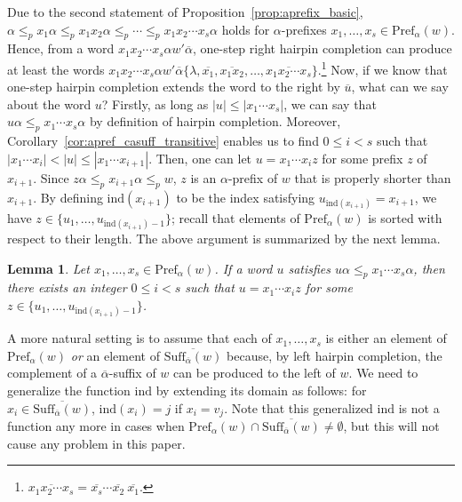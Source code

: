 \documentclass{article}
\theoremstyle{plain}
\newtheorem{lemma}{Lemma}
\theoremstyle{remark}
\newcommand{\Pref}{\ensuremath{\mathrm{Pref}}}
\newcommand{\Suff}{\ensuremath{\mathrm{Suff}}}
\newcommand{\ind}{\ensuremath{\mathrm{ind}}}
\newcommand{\calpha}{\ensuremath{\overline{\alpha}}}
\begin{document}
Due to the second statement of Proposition~\ref{prop:aprefix_basic}, $\alpha \le_p x_1 \alpha \le_p x_1 x_2 \alpha \le_p \cdots \le_p x_1 x_2 \cdots x_s \alpha$ holds for $\alpha$-prefixes $x_1, \ldots, x_s \in \Pref_\alpha(w)$. 
Hence, from a word $x_1 x_2 \cdots x_s \alpha w' \calpha$, one-step right hairpin completion can produce at least the words $x_1 x_2 \cdots x_s \alpha w' \calpha \{\lambda, \overline{x_1}, \overline{x_1x_2}, \ldots, \overline{x_1 x_2 \cdots x_s}\}$.\footnote{$\overline{x_1x_2 \cdots x_s} = \overline{x_s} \cdots \overline{x_2} \ \overline{x_1}$.} 
Now, if we know that one-step hairpin completion extends the word to the right by $\overline{u}$, what can we say about the word $u$? 
Firstly, as long as $|u| \le |x_1 \cdots x_s|$, we can say that $u\alpha \le_p x_1 \cdots x_s \alpha$ by definition of hairpin completion. 
Moreover, Corollary~\ref{cor:apref_casuff_transitive} enables us to find $0 \le i < s$ such that $|x_1 \cdots x_i| < |u| \le |x_1 \cdots x_{i+1}|$. 
Then, one can let $u = x_1 \cdots x_i z$ for some prefix $z$ of $x_{i+1}$. 
Since $z \alpha \le_p x_{i+1} \alpha \le_p w$, $z$ is an $\alpha$-prefix of $w$ that is properly shorter than $x_{i+1}$. 
By defining $\ind(x_{i+1})$ to be the index satisfying $u_{\ind(x_{i+1})} = x_{i+1}$, we have $z \in \{u_1, \ldots, u_{\ind(x_{i+1})-1}\}$; recall that elements of $\Pref_\alpha(w)$ is sorted with respect to their length. 
The above argument is summarized by the next lemma. 

\begin{lemma}\label{lem:aprefix_prefix}
	Let $x_1, \ldots, x_s \in \Pref_\alpha(w)$. 
	If a word $u$ satisfies $u\alpha \le_p x_1 \cdots x_s \alpha$, then there exists an integer $0 \le i < s$ such that $u = x_1 \cdots x_i z$ for some $z \in \{u_1, \ldots, u_{\ind(x_{i+1})-1}\}$. 
\end{lemma}

A more natural setting is to assume that each of $x_1, \ldots, x_s$ is either an element of $\Pref_\alpha(w)$ {\it or} an element of $\overline{\Suff_{\calpha}(w)}$ because, by left hairpin completion, the complement of a $\calpha$-suffix of $w$ can be produced to the left of $w$. 
We need to generalize the function $\ind$ by extending its domain as follows: for $x_i \in \overline{\Suff_{\calpha}(w)}$, $\ind(x_i) = j$ if $x_i = v_j$. 
Note that this generalized $\ind$ is not a function any more in cases when $\Pref_\alpha(w) \cap \overline{\Suff_{\calpha}(w)} \neq \emptyset$, but this will not cause any problem in this paper. 
\end{document}
